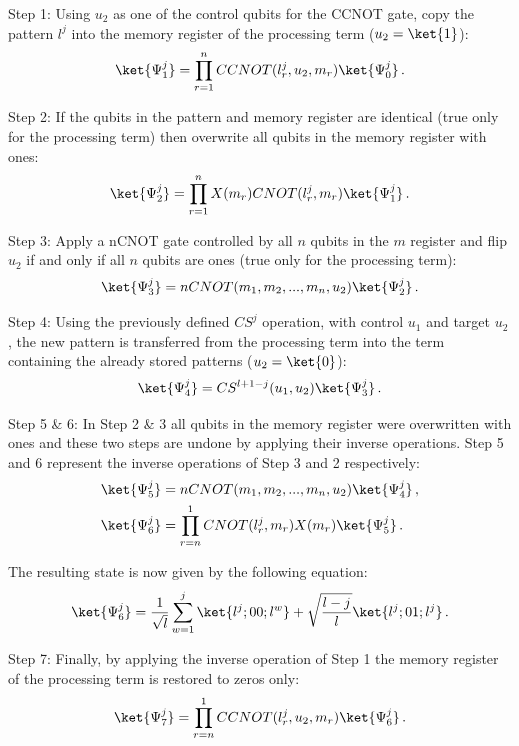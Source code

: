 \begin{bluebox}
Step 1: Using $u_2$ as one of the control qubits for the CCNOT gate, copy the pattern $l^j$ into the memory register of the processing term ($u_2=\ket{1}$):
\begin{equation}
\label{equ:trug1}
\ket{\Psi^j_1} = \prod_{r=1}^n CCNOT(l^j_r,u_2,m_r)\ket{\Psi^j_0}\, . 
\end{equation}

Step 2: If the qubits in the pattern and memory register are identical (true only for the processing term) then overwrite all qubits in the memory register with ones:
\begin{equation}
\label{equ:trug2}
\ket{\Psi^j_2} = \prod_{r=1}^n X(m_r)CNOT(l^j_r,m_r)\ket{\Psi^j_1}\, .
\end{equation}

Step 3: Apply a nCNOT gate controlled by all $n$ qubits in the $m$ register and flip $u_2$ if and only if all $n$ qubits are ones (true only for the processing term):
\begin{equation}
\label{equ:trug3}
\ket{\Psi^j_3} = nCNOT(m_1,m_2,...,m_n,u_2)\ket{\Psi^j_2}\, .
\end{equation}

Step 4: Using the previously defined $CS^j$ operation, with control $u_1$ and target $u_2$ , the new pattern is transferred from the processing term into the term containing the already stored patterns ($u_2 = \ket{0}$):
\begin{equation}
\label{equ:trug4}
\ket{\Psi^j_4} = CS^{l+1-j}(u_1,u_2) \ket{\Psi^j_3} \, .
\end{equation}
\end{bluebox}
\begin{bluebox}
Step 5 \& 6: In Step 2 \& 3 all qubits in the memory register were overwritten with ones and these two steps are undone by applying their inverse operations. Step 5 and 6 represent the inverse operations of Step 3 and 2 respectively:
\begin{align}
\label{equ:trug56}
\ket{\Psi^j_5} &= nCNOT(m_1,m_2,...,m_n,u_2)\ket{\Psi^j_4}\, , \\
\ket{\Psi^j_6} &= \prod_{r=n}^1 CNOT(l^j_r,m_r)X(m_r)\ket{\Psi^j_5}\, .
\end{align}

The resulting state is now given by the following equation:
\begin{equation}
\label{equ:trug6}
\ket{\Psi^j_6} = \frac{1}{\sqrt{l}} \sum^{j}_{w=1} \ket{l^j;00;l^w} + \sqrt{\frac{l-j}{l}} \ket{l^j;01;l^j}\, .
\end{equation}

Step 7: Finally, by applying the inverse operation of Step 1 the memory register of the processing term is restored to zeros only:
\begin{equation}
\label{equ:trug7}
\ket{\Psi^j_7} = \prod_{r=n}^1 CCNOT(l^j_r,u_2,m_r) \ket{\Psi^j_6}\, .
\end{equation}
\end{bluebox}

